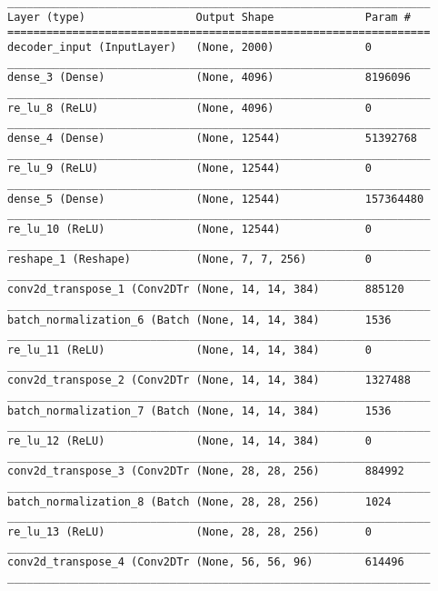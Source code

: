 \begin{lstlisting}[caption={AlexNet \ac{VAE} Decoder},captionpos=b,basicstyle=\tiny, label={lst:alexnet-vae-decoder}]
_________________________________________________________________
Layer (type)                 Output Shape              Param #
=================================================================
decoder_input (InputLayer)   (None, 2000)              0
_________________________________________________________________
dense_3 (Dense)              (None, 4096)              8196096
_________________________________________________________________
re_lu_8 (ReLU)               (None, 4096)              0
_________________________________________________________________
dense_4 (Dense)              (None, 12544)             51392768
_________________________________________________________________
re_lu_9 (ReLU)               (None, 12544)             0
_________________________________________________________________
dense_5 (Dense)              (None, 12544)             157364480
_________________________________________________________________
re_lu_10 (ReLU)              (None, 12544)             0
_________________________________________________________________
reshape_1 (Reshape)          (None, 7, 7, 256)         0
_________________________________________________________________
conv2d_transpose_1 (Conv2DTr (None, 14, 14, 384)       885120
_________________________________________________________________
batch_normalization_6 (Batch (None, 14, 14, 384)       1536
_________________________________________________________________
re_lu_11 (ReLU)              (None, 14, 14, 384)       0
_________________________________________________________________
conv2d_transpose_2 (Conv2DTr (None, 14, 14, 384)       1327488
_________________________________________________________________
batch_normalization_7 (Batch (None, 14, 14, 384)       1536
_________________________________________________________________
re_lu_12 (ReLU)              (None, 14, 14, 384)       0
_________________________________________________________________
conv2d_transpose_3 (Conv2DTr (None, 28, 28, 256)       884992
_________________________________________________________________
batch_normalization_8 (Batch (None, 28, 28, 256)       1024
_________________________________________________________________
re_lu_13 (ReLU)              (None, 28, 28, 256)       0
_________________________________________________________________
conv2d_transpose_4 (Conv2DTr (None, 56, 56, 96)        614496
_________________________________________________________________

\end{lstlisting}
